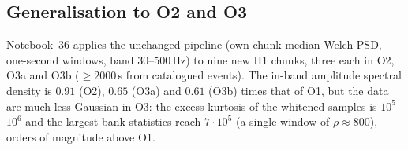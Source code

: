\subsection{Generalisation to O2 and O3}\label{sec:o2o3}
Notebook~36 applies the unchanged pipeline (own-chunk median-Welch PSD, one-second windows, band $30$--$500\,$Hz) to nine new H1 chunks, three each in O2, O3a and O3b ($\ge2000\,$s from catalogued events). The in-band amplitude spectral density is $0.91$ (O2), $0.65$ (O3a) and $0.61$ (O3b) times that of O1, but the data are much less Gaussian in O3: the excess kurtosis of the whitened samples is $10^{5}$--$10^{6}$ and the largest bank statistics reach $7\cdot10^{5}$ (a single window of $\rho\approx800$), orders of magnitude above O1.
\begin{table}[h]\centering\small
{}
\caption{Transfer of the O1 calibration and sensitivity to O2 and O3 (mean $\snr_{50}$ over the three morphologies; three chunks per run; a threshold from three chunks at $10^{-3}$ rests on $\approx12$ windows).}\label{tab:o2o3}
\end{table}
